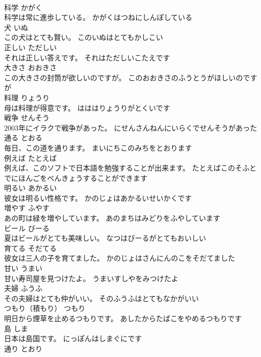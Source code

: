 \documentclass[8pt]{extreport}
\begin{document}
\begin{CJK}{UTF8}{min}
\\	科学	かがく	
\\	科学は常に進歩している。	かがくはつねにしんぽしている	
\\	犬	いぬ	
\\	この犬はとても賢い。	このいぬはとてもかしこい	
\\	正しい	ただしい	
\\	それは正しい答えです。	それはただしいこたえです	
\\	大きさ	おおきさ	
\\	この大きさの封筒が欲しいのですが。	このおおきさのふうとうがほしいのですが	
\\	料理	りょうり	
\\	母は料理が得意です。	はははりょうりがとくいです	
\\	戦争	せんそう	
\\	2003年にイラクで戦争があった。	にせんさんねんにいらくでせんそうがあった	
\\	通る	とおる	
\\	毎日、この道を通ります。	まいにちこのみちをとおります	
\\	例えば	たとえば	
\\	例えば、このソフトで日本語を勉強することが出来ます。	たとえばこのそふとでにほんごをべんきょうすることができます	
\\	明るい	あかるい	
\\	彼女は明るい性格です。	かのじょはあかるいせいかくです	
\\	増やす	ふやす	
\\	あの町は緑を増やしています。	あのまちはみどりをふやしています	
\\	ビール	びーる	
\\	夏はビールがとても美味しい。	なつはびーるがとてもおいしい	
\\	育てる	そだてる	
\\	彼女は三人の子を育てました。	かのじょはさんにんのこをそだてました	
\\	甘い	うまい	
\\	甘い寿司屋を見つけたよ。	うまいすしやをみつけたよ	
\\	夫婦	ふうふ	
\\	その夫婦はとても仲がいい。	そのふうふはとてもなかがいい	
\\	つもり（積もり）	つもり	
\\	明日から煙草を止めるつもりです。	あしたからたばこをやめるつもりです	
\\	島	しま	
\\	日本は島国です。	にっぽんはしまぐにです	
\\	通り	とおり	

\end{CJK}
\end{document}
